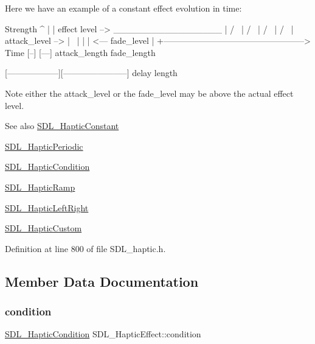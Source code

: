 Here we have an example of a constant effect evolution in time\+: \begin{DoxyVerb}Strength
^
|
|    effect level -->  _________________
|                     /                 \
|                    /                   \
|                   /                     \
|                  /                       \
| attack_level --> |                        \
|                  |                        |  <---  fade_level
|
+--------------------------------------------------> Time
                   [--]                 [---]
                   attack_length        fade_length

[------------------][-----------------------]
delay               length
\end{DoxyVerb}


Note either the attack\+\_\+level or the fade\+\_\+level may be above the actual effect level.

\begin{DoxySeeAlso}{See also}
\mbox{\hyperlink{struct_s_d_l___haptic_constant}{S\+D\+L\+\_\+\+Haptic\+Constant}} 

\mbox{\hyperlink{struct_s_d_l___haptic_periodic}{S\+D\+L\+\_\+\+Haptic\+Periodic}} 

\mbox{\hyperlink{struct_s_d_l___haptic_condition}{S\+D\+L\+\_\+\+Haptic\+Condition}} 

\mbox{\hyperlink{struct_s_d_l___haptic_ramp}{S\+D\+L\+\_\+\+Haptic\+Ramp}} 

\mbox{\hyperlink{struct_s_d_l___haptic_left_right}{S\+D\+L\+\_\+\+Haptic\+Left\+Right}} 

\mbox{\hyperlink{struct_s_d_l___haptic_custom}{S\+D\+L\+\_\+\+Haptic\+Custom}} 
\end{DoxySeeAlso}


Definition at line 800 of file S\+D\+L\+\_\+haptic.\+h.



\subsection{Member Data Documentation}
\mbox{\label{union_s_d_l___haptic_effect_aa8fdd1ba202ccd7e61f48ef9977080d2}} 
\subsubsection{\texorpdfstring{condition}{condition}}
{\footnotesize\ttfamily \mbox{\hyperlink{struct_s_d_l___haptic_condition}{S\+D\+L\+\_\+\+Haptic\+Condition}} S\+D\+L\+\_\+\+Haptic\+Effect\+::condition}

